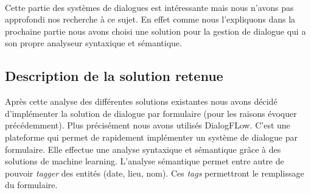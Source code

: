 ~\\\indent
Cette partie des systèmes de dialogues est intéressante mais nous n'avons pas approfondi nos recherche à ce sujet. En effet comme nous l'expliquons dans la prochaine partie nous avons choisi une solution pour la gestion de dialogue qui a son propre analyseur syntaxique et sémantique.

\subsection{Description de la solution retenue}
Après cette analyse des différentes solutions existantes nous avons décidé d'implémenter la solution de dialogue par formulaire (pour les raisons évoquer précédemment). Plus précisément nous avons utilisés DialogFLow. C'est une plateforme qui permet de rapidement implémenter un système de dialogue par formulaire. Elle effectue une analyse syntaxique et sémantique grâce à des solutions de machine learning. L'analyse sémantique permet entre autre de pouvoir \emph{tagger} des entités (date, lieu, nom). Ces \emph{tags} permettront le remplissage du formulaire.